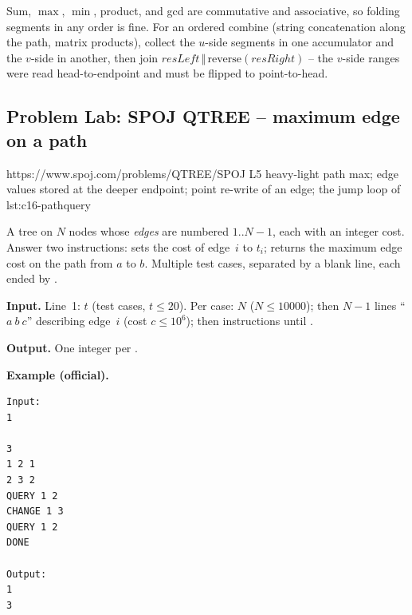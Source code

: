 \begin{warningbox}
Sum, \(\max\), \(\min\), product, and gcd are commutative and associative, so folding segments in any order is fine.  For an ordered combine (string concatenation along the path, matrix products), collect the \(u\)-side segments in one accumulator and the \(v\)-side in another, then join \(\mathit{resLeft}\,\Vert\,\mathrm{reverse}(\mathit{resRight})\) -- the \(v\)-side ranges were read head-to-endpoint and must be flipped to point-to-head.
\end{warningbox}

\subsection{Problem Lab: SPOJ QTREE -- maximum edge on a path}

  {https://www.spoj.com/problems/QTREE/}{SPOJ L5}
  {heavy-light path max; edge values stored at the deeper endpoint; point re-write of an edge; the jump loop of lst:c16-pathquery}

\begin{problemstatement}
A tree on \(N\) nodes whose \emph{edges} are numbered \(1..N\!-\!1\), each with an integer cost. Answer two instructions:  sets the cost of edge~\(i\) to \(t_i\);  returns the maximum edge cost on the path from \(a\) to \(b\). Multiple test cases, separated by a blank line, each ended by .

\textbf{Input.} Line~1: \(t\) (test cases, \(t\le 20\)). Per case: \(N\) (\(N\le 10000\)); then \(N-1\) lines ``\(a\ b\ c\)'' describing edge~\(i\) (cost \(c\le 10^6\)); then instructions until .

\textbf{Output.} One integer per .

\textbf{Example (official).}
\begin{verbatim}
Input:
1

3
1 2 1
2 3 2
QUERY 1 2
CHANGE 1 3
QUERY 1 2
DONE

Output:
1
3
\end{verbatim}
\end{problemstatement}

